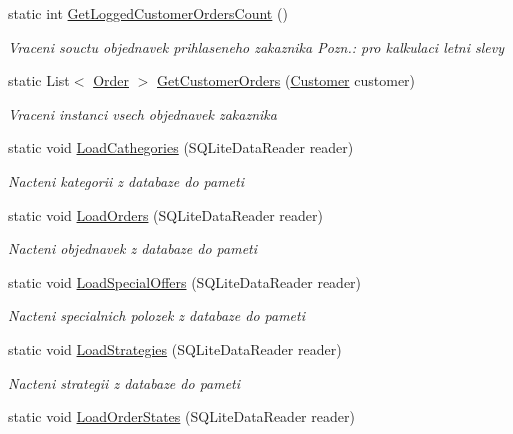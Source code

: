 \begin{DoxyCompactItemize}
static int \mbox{\hyperlink{class_eshop_1_1_database_aabc0c3c9814f08e1547d9f5203027537}{Get\+Logged\+Customer\+Orders\+Count}} ()
\begin{DoxyCompactList}\small\item\em Vraceni souctu objednavek prihlaseneho zakaznika Pozn.\+: pro kalkulaci letni slevy \end{DoxyCompactList}\item 
static List$<$ \mbox{\hyperlink{class_eshop_1_1_order}{Order}} $>$ \mbox{\hyperlink{class_eshop_1_1_database_a0e0919b49fd17301bfb70453552948b6}{Get\+Customer\+Orders}} (\mbox{\hyperlink{class_eshop_1_1_customer}{Customer}} customer)
\begin{DoxyCompactList}\small\item\em Vraceni instanci vsech objednavek zakaznika \end{DoxyCompactList}\item 
static void \mbox{\hyperlink{class_eshop_1_1_database_a740a0b27bde20b1000993f96550a570d}{Load\+Cathegories}} (S\+Q\+Lite\+Data\+Reader reader)
\begin{DoxyCompactList}\small\item\em Nacteni kategorii z databaze do pameti \end{DoxyCompactList}\item 
static void \mbox{\hyperlink{class_eshop_1_1_database_ac17365c3ead366345290d2e8919f0e1a}{Load\+Orders}} (S\+Q\+Lite\+Data\+Reader reader)
\begin{DoxyCompactList}\small\item\em Nacteni objednavek z databaze do pameti \end{DoxyCompactList}\item 
static void \mbox{\hyperlink{class_eshop_1_1_database_a329b6c5162884bb8eaa7407c0a0526f3}{Load\+Special\+Offers}} (S\+Q\+Lite\+Data\+Reader reader)
\begin{DoxyCompactList}\small\item\em Nacteni specialnich polozek z databaze do pameti \end{DoxyCompactList}\item 
static void \mbox{\hyperlink{class_eshop_1_1_database_af63f03aac766810014723c21d8798e35}{Load\+Strategies}} (S\+Q\+Lite\+Data\+Reader reader)
\begin{DoxyCompactList}\small\item\em Nacteni strategii z databaze do pameti \end{DoxyCompactList}\item 
static void \mbox{\hyperlink{class_eshop_1_1_database_aa12ddf3915d8952fb6f5e4c87b272444}{Load\+Order\+States}} (S\+Q\+Lite\+Data\+Reader reader)

\end{DoxyCompactItemize}
